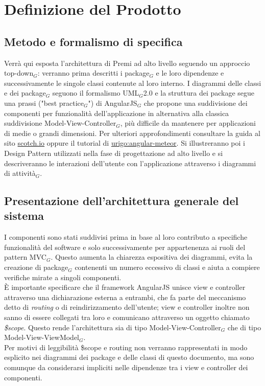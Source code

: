 \newpage
\section{Definizione del Prodotto}

\subsection{Metodo e formalismo di specifica}
Verrà qui esposta l'architettura di Premi ad alto livello seguendo un approccio top-down$_G$: verranno prima descritti i package$_G$ e le loro dipendenze e successivamente le singole classi contenute al loro interno. I diagrammi delle classi e dei package$_G$ seguono il formalismo UML$_G$2.0 e la struttura dei package segue una prassi ("best practice$_G$") di AngularJS$_G$ che propone una suddivisione dei componenti per funzionalità dell'applicazione in alternativa alla classica suddivisione Model-View-Controller$_G$, più difficile da mantenere per applicazioni di medie o grandi dimensioni. Per ulteriori approfondimenti consultare la guida al sito \href{https://scotch.io/tutorials/angularjs-best-practices-directory-structure}{scotch.io} oppure il tutorial di \href{http://angular-meteor.com/tutorial/step_07}{urigo:angular-meteor}.
Si illustreranno poi i Design Pattern utilizzati nella fase di progettazione ad alto livello e si descriveranno le interazioni dell'utente con l'applicazione attraverso i diagrammi di attività$_G$.


\subsection{Presentazione dell'architettura generale del sistema}
I componenti sono stati suddivisi prima in base al loro contributo a specifiche funzionalità del software e solo successivamente per appartenenza ai ruoli del pattern MVC$_G$. Questo aumenta la chiarezza espositiva dei diagrammi, evita la creazione di package$_G$ contenenti un numero eccessivo di classi e aiuta a compiere verifiche mirate a singoli componenti. \\
È importante specificare che il framework AngularJS unisce view e controller attraverso una dichiarazione esterna a entrambi, che fa parte del meccanismo detto di \textit{routing} o di reindirizzamento dell'utente; view e controller inoltre non sanno di essere collegati tra loro e comunicano attraverso un oggetto chiamato \textit{\$scope}. Questo rende l'architettura sia di tipo Model-View-Controller$_G$ che di tipo Model-View-ViewModel$_G$. \\
Per motivi di leggibilità \$scope e routing non verranno rappresentati in modo esplicito nei diagrammi dei package e delle classi di questo documento, ma sono comunque da considerarsi impliciti nelle dipendenze tra i view e controller dei componenti.


